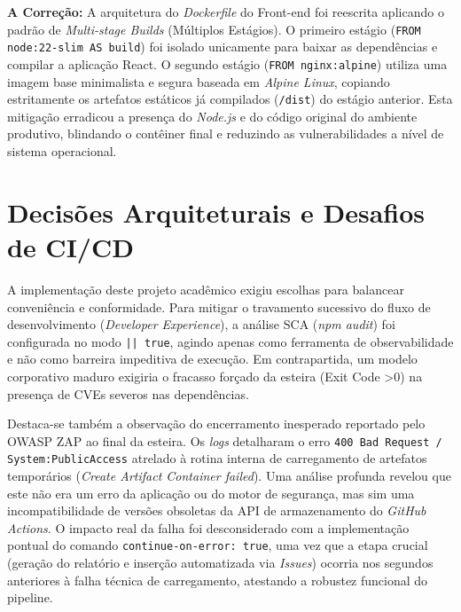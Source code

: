 \documentclass[12pt, a4paper]{article}
\begin{document}
\textbf{A Correção:} A arquitetura do \textit{Dockerfile} do Front-end foi reescrita aplicando o padrão de \textit{Multi-stage Builds} (Múltiplos Estágios). O primeiro estágio (\texttt{FROM node:22-slim AS build}) foi isolado unicamente para baixar as dependências e compilar a aplicação React. O segundo estágio (\texttt{FROM nginx:alpine}) utiliza uma imagem base minimalista e segura baseada em \textit{Alpine Linux}, copiando estritamente os artefatos estáticos já compilados (\texttt{/dist}) do estágio anterior. Esta mitigação erradicou a presença do \textit{Node.js} e do código original do ambiente produtivo, blindando o contêiner final e reduzindo as vulnerabilidades a nível de sistema operacional.

\section{Decisões Arquiteturais e Desafios de CI/CD}

A implementação deste projeto acadêmico exigiu escolhas para balancear conveniência e conformidade. Para mitigar o travamento sucessivo do fluxo de desenvolvimento (\textit{Developer Experience}), a análise SCA (\textit{npm audit}) foi configurada no modo \texttt{|| true}, agindo apenas como ferramenta de observabilidade e não como barreira impeditiva de execução. Em contrapartida, um modelo corporativo maduro exigiria o fracasso forçado da esteira (Exit Code \textgreater 0) na presença de CVEs severos nas dependências.

Destaca-se também a observação do encerramento inesperado reportado pelo OWASP ZAP ao final da esteira. Os \textit{logs} detalharam o erro \texttt{400 Bad Request / System:PublicAccess} atrelado à rotina interna de carregamento de artefatos temporários (\textit{Create Artifact Container failed}). Uma análise profunda revelou que este não era um erro da aplicação ou do motor de segurança, mas sim uma incompatibilidade de versões obsoletas da API de armazenamento do \textit{GitHub Actions}. O impacto real da falha foi desconsiderado com a implementação pontual do comando \texttt{continue-on-error: true}, uma vez que a etapa crucial (geração do relatório e inserção automatizada via \textit{Issues}) ocorria nos segundos anteriores à falha técnica de carregamento, atestando a robustez funcional do pipeline.
\end{document}
